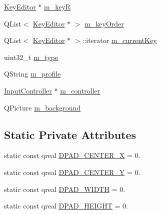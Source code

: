 \begin{DoxyCompactItemize}
\item 
\mbox{\hyperlink{class_q_g_b_a_1_1_key_editor}{Key\+Editor}} $\ast$ \mbox{\hyperlink{class_q_g_b_a_1_1_g_b_a_key_editor_a457be8e63aaa8aff81a658ca8fa54e3b}{m\+\_\+keyR}}
\item 
Q\+List$<$ \mbox{\hyperlink{class_q_g_b_a_1_1_key_editor}{Key\+Editor}} $\ast$ $>$ \mbox{\hyperlink{class_q_g_b_a_1_1_g_b_a_key_editor_a9875bdd4c5b3b08694ee41968ca07246}{m\+\_\+key\+Order}}
\item 
Q\+List$<$ \mbox{\hyperlink{class_q_g_b_a_1_1_key_editor}{Key\+Editor}} $\ast$ $>$\+::iterator \mbox{\hyperlink{class_q_g_b_a_1_1_g_b_a_key_editor_ab8c8eb4d2cc6c157fae990a05de0e43b}{m\+\_\+current\+Key}}
\item 
uint32\+\_\+t \mbox{\hyperlink{class_q_g_b_a_1_1_g_b_a_key_editor_a43b774b1f04a404e84454570a9958499}{m\+\_\+type}}
\item 
Q\+String \mbox{\hyperlink{class_q_g_b_a_1_1_g_b_a_key_editor_ad4467109731b461d97f7ea9fb1b5b75d}{m\+\_\+profile}}
\item 
\mbox{\hyperlink{class_q_g_b_a_1_1_input_controller}{Input\+Controller}} $\ast$ \mbox{\hyperlink{class_q_g_b_a_1_1_g_b_a_key_editor_a4165b3393c506d1079b4d7febdf153b0}{m\+\_\+controller}}
\item 
Q\+Picture \mbox{\hyperlink{class_q_g_b_a_1_1_g_b_a_key_editor_ac0ae2f24e5cbb799a71bf4eee2026271}{m\+\_\+background}}
\end{DoxyCompactItemize}
\subsection*{Static Private Attributes}
\begin{DoxyCompactItemize}
\item 
static const qreal \mbox{\hyperlink{class_q_g_b_a_1_1_g_b_a_key_editor_a174af89dd424fdd930c4deb2ea0238f0}{D\+P\+A\+D\+\_\+\+C\+E\+N\+T\+E\+R\+\_\+X}} = 0.
\item 
static const qreal \mbox{\hyperlink{class_q_g_b_a_1_1_g_b_a_key_editor_a78a923e084d49838998305682f1cb697}{D\+P\+A\+D\+\_\+\+C\+E\+N\+T\+E\+R\+\_\+Y}} = 0.
\item 
static const qreal \mbox{\hyperlink{class_q_g_b_a_1_1_g_b_a_key_editor_aa1528b9a8b465cfa883c8238940fc617}{D\+P\+A\+D\+\_\+\+W\+I\+D\+TH}} = 0.
\item 
static const qreal \mbox{\hyperlink{class_q_g_b_a_1_1_g_b_a_key_editor_aba075f57865356aad3e379eaa6550b2a}{D\+P\+A\+D\+\_\+\+H\+E\+I\+G\+HT}} = 0.
\end{DoxyCompactItemize}


